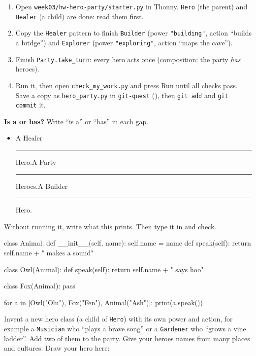 \namedateline

\begin{core}
\begin{enumerate}[itemsep=2pt]
  \item Open \texttt{week03/hw-hero-party/starter.py} in Thonny. \texttt{Hero} (the parent) and \texttt{Healer} (a child) are done: read them first.
  \item Copy the \texttt{Healer} pattern to finish \texttt{Builder} (power \texttt{"building"}, action \enquote{builds a bridge}) and \texttt{Explorer} (power \texttt{"exploring"}, action \enquote{maps the cave}).
  \item Finish \texttt{Party.take\_turn}: every hero acts once (composition: the party \emph{has} heroes).
  \item Run it, then open \texttt{check\_my\_work.py} and press Run until all checks pass. Save a copy as \texttt{hero\_party.py} in \texttt{git-quest} (), then \texttt{git add} and \texttt{git commit} it.
\end{enumerate}
\textbf{Is a or has?} Write \enquote{is a} or \enquote{has} in each gap.
\begin{itemize}[itemsep=1pt]
  \item A Healer \rule{2cm}{0.4pt} Hero.\qquad A Party \rule{2cm}{0.4pt} Heroes.\qquad A Builder \rule{2cm}{0.4pt} Hero.
\end{itemize}
\end{core}

\begin{challenge}
Without running it, write what this prints. Then type it in and check.
\begin{pycode}
class Animal:
    def __init__(self, name):
        self.name = name
    def speak(self):
        return self.name + " makes a sound"

class Owl(Animal):
    def speak(self):
        return self.name + " says hoo"

class Fox(Animal):
    pass

for a in [Owl("Olu"), Fox("Fen"), Animal("Ash")]:
    print(a.speak())
\end{pycode}
\end{challenge}

\begin{creative}
Invent a new hero class (a child of \texttt{Hero}) with its own power and action, for example a \texttt{Musician} who \enquote{plays a brave song} or a \texttt{Gardener} who \enquote{grows a vine ladder}. Add two of them to the party. Give your heroes names from many places and cultures. Draw your hero here:
\answerspace{3.5cm}
\end{creative}

